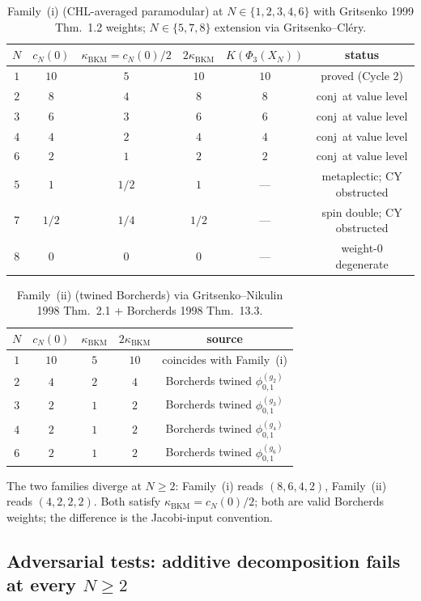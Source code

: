 \documentclass[11pt]{article}
\theoremstyle{definition}
\newcommand{\kBKM}{\kappa_{\mathrm{BKM}}}
\begin{document}
\begin{table}[h!]
\centering
\begin{tabular}{c|c|c|c|c|c}
$N$ & $c_N(0)$ & $\kBKM = c_N(0)/2$ & $2 \kBKM$ & $K(\Phi_3(X_N))$ & status \\ \hline
$1$ & $10$ & $5$ & $10$ & $10$ & proved (Cycle 2) \\
$2$ & $8$  & $4$ & $8$  & $8$  & conj\ at value level \\
$3$ & $6$  & $3$ & $6$  & $6$  & conj\ at value level \\
$4$ & $4$  & $2$ & $4$  & $4$  & conj\ at value level \\
$6$ & $2$  & $1$ & $2$  & $2$  & conj\ at value level \\
$5$ & $1$  & $1/2$ & $1$ & --- & metaplectic; CY obstructed \\
$7$ & $1/2$ & $1/4$ & $1/2$ & --- & spin double; CY obstructed \\
$8$ & $0$ & $0$ & $0$ & --- & weight-$0$ degenerate
\end{tabular}
\caption{Family~(i) (CHL-averaged paramodular) at $N \in \{1, 2, 3, 4, 6\}$
with Gritsenko 1999 Thm.~1.2 weights; $N \in \{5, 7, 8\}$ extension via
Gritsenko--Cl\'ery.}
\end{table}

\begin{table}[h!]
\centering
\begin{tabular}{c|c|c|c|c}
$N$ & $c_N(0)$ & $\kBKM$ & $2 \kBKM$ & source \\ \hline
$1$ & $10$ & $5$ & $10$ & coincides with Family~(i) \\
$2$ & $4$ & $2$ & $4$ & Borcherds twined $\phi^{(g_2)}_{0,1}$ \\
$3$ & $2$ & $1$ & $2$ & Borcherds twined $\phi^{(g_3)}_{0,1}$ \\
$4$ & $2$ & $1$ & $2$ & Borcherds twined $\phi^{(g_4)}_{0,1}$ \\
$6$ & $2$ & $1$ & $2$ & Borcherds twined $\phi^{(g_6)}_{0,1}$
\end{tabular}
\caption{Family~(ii) (twined Borcherds) via Gritsenko--Nikulin 1998
Thm.~2.1 + Borcherds 1998 Thm.~13.3.}
\end{table}

The two families diverge at $N \geq 2$: Family~(i) reads
$(8, 6, 4, 2)$, Family~(ii) reads $(4, 2, 2, 2)$. Both satisfy
$\kBKM = c_N(0)/2$; both are valid Borcherds weights; the difference
is the Jacobi-input convention.

\subsection{Adversarial tests: additive decomposition fails at every $N \geq 2$}
\end{document}
